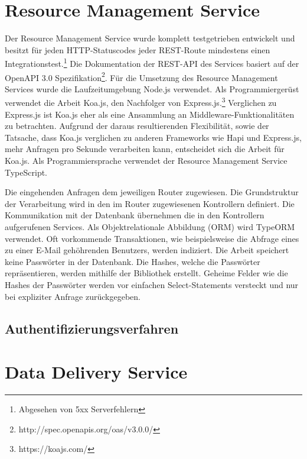 \section{Resource Management Service}
\label{sec:resourcemanagementservice}
Der Resource Management Service wurde komplett testgetrieben entwickelt und besitzt
für jeden HTTP-Statuscodes jeder REST-Route mindestens einen Integrationstest.\footnote{Abgesehen von 5xx Serverfehlern}
Die Dokumentation der REST-API des Services basiert auf der OpenAPI 3.0
Spezifikation\footnote{http://spec.openapis.org/oas/v3.0.0/}. Für die Umsetzung des Resource Management Services
wurde die Laufzeitumgebung Node.js verwendet. Als Programmiergerüst verwendet die Arbeit Koa.js, den Nachfolger
von Express.js.\footnote{https://koajs.com/} Verglichen zu Express.js ist Koa.js eher als eine Ansammlung
an Middleware-Funktionalitäten zu betrachten\cite[2. Absatz]{ExpressVsKoa}. Aufgrund der daraus resultierenden
Flexibilität, sowie der Tatsache, dass Koa.js verglichen zu anderen Frameworks wie Hapi und Express.js,
mehr Anfragen pro Sekunde verarbeiten kann,\cite{ExpressVsKoaVsHapiPerformance}
entscheidet sich die Arbeit für Koa.js. Als Programmiersprache verwendet der Resource Management Service
TypeScript.

Die eingehenden Anfragen dem jeweiligen Router zugewiesen. Die Grundstruktur der Verarbeitung wird in den im Router
zugewiesenen Kontrollern definiert. Die Kommunikation mit der Datenbank übernehmen die in den Kontrollern aufgerufenen
Services. Als Objektrelationale Abbildung (ORM) wird TypeORM verwendet. Oft vorkommende Transaktionen, wie beispielsweise
die Abfrage eines zu einer E-Mail gehöhrenden Benutzers, werden indiziert. Die Arbeit speichert keine Passwörter in der
Datenbank. Die Hashes, welche die Passwörter repräsentieren, werden mithilfe der Bibliothek  erstellt.
Geheime Felder wie die Hashes der Passwörter werden vor einfachen Select-Statements versteckt und nur bei
expliziter Anfrage zurückgegeben. 

\subsection{Authentifizierungsverfahren}
\label{subsec:authentifizierungsverfahren}

\section{Data Delivery Service}
\label{sec:datadeliveryservice}

